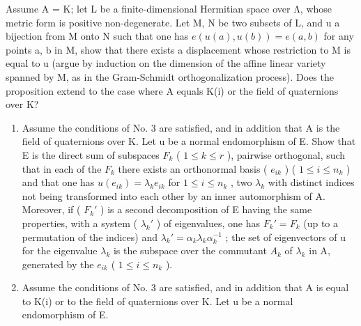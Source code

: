 Assume A = K; let L be a finite-dimensional Hermitian space over Λ, whose metric form is positive non-degenerate. Let M, N be two subsets of L, and u a bijection from M onto N such that one has \(e(u(a), u(b)) = e(a, b)\) for any points a, b in M, show that there exists a displacement whose restriction to M is equal to u (argue by induction on the dimension of the affine linear variety spanned by M, as in the Gram-Schmidt orthogonalization process). Does the proposition extend to the case where A equals K(i) or the field of quaternions over K?

\begin{enumerate}
\def\labelenumi{\arabic{enumi})}
\setcounter{enumi}{8}
\item
  Assume the conditions of No. 3 are satisfied, and in addition that A is the field of quaternions over K. Let u be a normal endomorphism of E. Show that E is the direct sum of subspaces \(F_{k}\) ( \(1 \leqslant k \leqslant r\) ), pairwise orthogonal, such that in each of the \(F_{k}\) there exists an orthonormal basis ( \(e_{ik}\) ) ( \(1 \leqslant i \leqslant n_{k}\) ) and that one has \(u(e_{ik}) = \lambda_{k}e_{ik}\) for \(1 \leqslant i \leqslant n_{k}\) , two \(\lambda_{k}\) with distinct indices not being transformed into each other by an inner automorphism of A. Moreover, if ( \(F_{k}'\) ) is a second decomposition of E having the same properties, with a system ( \(\lambda_{k}'\) ) of eigenvalues, one has \(F_{k}' = F_{k}\) (up to a permutation of the indices) and \(\lambda_{k}' = \alpha_{k}\lambda_{k}\alpha_{k}^{-1}\) ; the set of eigenvectors of u for the eigenvalue \(\lambda_{k}\) is the subspace over the commutant \(A_{k}\) of \(\lambda_{k}\) in A, generated by the \(e_{ik}\) ( \(1 \leqslant i \leqslant n_{k}\) ).
\item
  Assume the conditions of No. 3 are satisfied, and in addition that A is equal to K(i) or to the field of quaternions over K. Let u be a normal endomorphism of E.
\end{enumerate}

